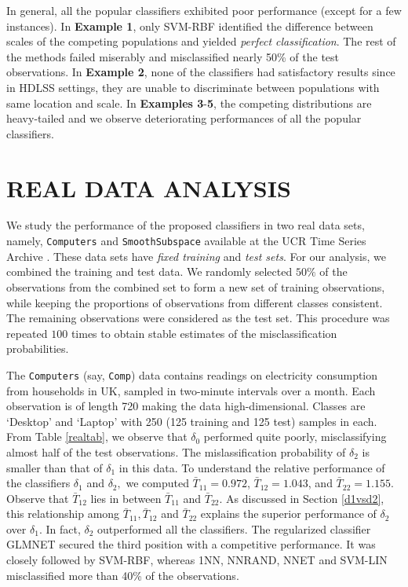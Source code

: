 \documentclass[twoside]{article}
\newcommand{\0}{\mathbf{0}}
\newcommand{\1}{\mathbf{1}}
\numberwithin{equation}{section}
\begin{document}
In general, all the popular classifiers exhibited poor performance (except for a few instances). In {\bf Example 1}, only SVM-RBF identified the difference between scales of the competing populations and yielded {\it perfect classification}. The rest of the methods failed miserably and misclassified nearly 50\% of the test observations. In {\bf Example 2}, none of the classifiers had satisfactory results since in HDLSS settings, they are unable to discriminate between populations with same location and scale. In {\bf Examples 3}-{\bf 5}, the competing distributions are heavy-tailed and we observe deteriorating performances of all the popular classifiers.

\section{REAL DATA ANALYSIS}\label{real}
We study the performance of the proposed classifiers in two real data sets, namely, {\tt Computers} and  {\tt SmoothSubspace} available at the UCR Time Series Archive \citep[see][]{UCRArchive2018}. These data sets have {\it fixed training} and {\it test sets}. For our analysis, we combined the training and test data. We randomly selected $50\%$ of the observations from the combined set to form a new set of training observations, while keeping the proportions of observations from different classes consistent. The remaining observations were considered as the test set. This procedure was repeated $100$ times to obtain stable estimates of the misclassification probabilities. %

\noindent The {\tt Computers} (say, {\tt Comp}) data contains readings on electricity consumption from households in UK, sampled in two-minute intervals over a month. Each observation is of length 720 making the data high-dimensional. Classes are `Desktop' and `Laptop' with 250 (125 training and 125 test) samples in each. From Table \ref{realtab}, we observe that $\delta_0$ performed quite poorly, misclassifying almost half of the test observations. The mislassification probability of $\delta_2$ is smaller than that of $\delta_1$ in this data. To understand the relative performance of the classifiers $\delta_1$ and $\delta_2,$ we computed $\bar{T}_{11}=0.972$, $\bar{T}_{12}=1.043$, and $\bar{T}_{22}=1.155.$ Observe that $\bar{T}_{12}$ lies in between $\bar{T}_{11}$ and $\bar{T}_{22}$. As discussed in Section \ref{d1vsd2}, this relationship among $\bar{T}_{11},\bar{T}_{12}$ and $\bar{T}_{22}$ explains the superior performance of $\delta_2$ over $\delta_1.$ In fact, $\delta_2$ outperformed all the classifiers. The regularized classifier GLMNET secured the third position with a competitive performance. It was closely followed by SVM-RBF, whereas 1NN, NNRAND, NNET and SVM-LIN misclassified more than 40\% of the observations.
\end{document}
